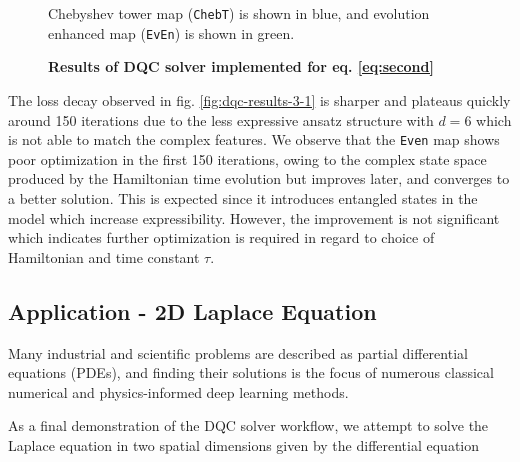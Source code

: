\documentclass[11pt,a4paper]{article}
\begin{document}
{\begin{figure}[H]
    \centering
    \caption{\textbf{Results of DQC solver implemented for eq. \ref{eq:second}}}
    Chebyshev tower map (\texttt{ChebT}) is shown in blue, and evolution enhanced map (\texttt{EvEn}) is shown in green.
    \label{fig:dqc-results-3}
\end{figure}
The loss decay observed in fig. \ref{fig:dqc-results-3-1} is sharper and plateaus quickly around 150 iterations due to the less expressive ansatz structure with $d=6$ which is not able to match the complex features.
We observe that the \texttt{Even} map shows poor optimization in the first 150 iterations, owing to the complex state space produced by the Hamiltonian time evolution but improves later, and converges to a better solution. This is expected since it introduces entangled states in the model which increase expressibility.
However, the improvement is not significant which indicates further optimization is required in regard to choice of Hamiltonian and time constant $\tau$.

\subsection{Application - 2D Laplace Equation}

Many industrial and scientific problems are described as partial differential equations (PDEs), and finding their solutions is the focus of numerous classical numerical and physics-informed deep learning methods.

As a final demonstration of the DQC solver workflow, we attempt to solve the Laplace equation in two spatial dimensions given by the differential equation

}
\end{document}

